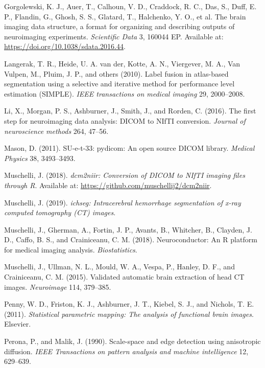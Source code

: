 \documentclass[utf8]{frontiersSCNS}
\begin{document}
\leavevmode\hypertarget{ref-bids}{}%
Gorgolewski, K. J., Auer, T., Calhoun, V. D., Craddock, R. C., Das, S., Duff, E. P., Flandin, G., Ghosh, S. S., Glatard, T., Halchenko, Y. O., et al. The brain imaging data structure, a format for organizing and describing outputs of neuroimaging experiments. \emph{Scientific Data} 3, 160044 EP. Available at: \url{https://doi.org/10.1038/sdata.2016.44}.

\leavevmode\hypertarget{ref-langerak2010label}{}%
Langerak, T. R., Heide, U. A. van der, Kotte, A. N., Viergever, M. A., Van Vulpen, M., Pluim, J. P., and others (2010). Label fusion in atlas-based segmentation using a selective and iterative method for performance level estimation (SIMPLE). \emph{IEEE transactions on medical imaging} 29, 2000--2008.

\leavevmode\hypertarget{ref-dcm2niix}{}%
Li, X., Morgan, P. S., Ashburner, J., Smith, J., and Rorden, C. (2016). The first step for neuroimaging data analysis: DICOM to NIfTI conversion. \emph{Journal of neuroscience methods} 264, 47--56.

\leavevmode\hypertarget{ref-pydicom}{}%
Mason, D. (2011). SU-e-t-33: pydicom: An open source DICOM library. \emph{Medical Physics} 38, 3493--3493.

\leavevmode\hypertarget{ref-dcm2niir}{}%
Muschelli, J. (2018). \emph{dcm2niir: Conversion of DICOM to NIfTI imaging files through R}. Available at: \url{https://github.com/muschellij2/dcm2niir}.

\leavevmode\hypertarget{ref-ichseg}{}%
Muschelli, J. (2019). \emph{ichseg: Intracerebral hemorrhage segmentation of x-ray computed tomography (CT) images}.

\leavevmode\hypertarget{ref-neuroconductor}{}%
Muschelli, J., Gherman, A., Fortin, J. P., Avants, B., Whitcher, B., Clayden, J. D., Caffo, B. S., and Crainiceanu, C. M. (2018). Neuroconductor: An R platform for medical imaging analysis. \emph{Biostatistics}.

\leavevmode\hypertarget{ref-ctbet}{}%
Muschelli, J., Ullman, N. L., Mould, W. A., Vespa, P., Hanley, D. F., and Crainiceanu, C. M. (2015). Validated automatic brain extraction of head CT images. \emph{Neuroimage} 114, 379--385.

\leavevmode\hypertarget{ref-spm}{}%
Penny, W. D., Friston, K. J., Ashburner, J. T., Kiebel, S. J., and Nichols, T. E. (2011). \emph{Statistical parametric mapping: The analysis of functional brain images}. Elsevier.

\leavevmode\hypertarget{ref-peronamalik}{}%
Perona, P., and Malik, J. (1990). Scale-space and edge detection using anisotropic diffusion. \emph{IEEE Transactions on pattern analysis and machine intelligence} 12, 629--639.
\end{document}
